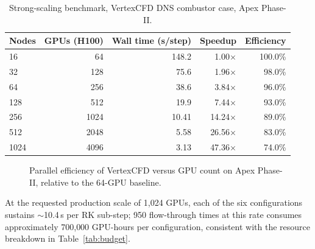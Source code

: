 \documentclass[11pt,a4paper]{scrartcl}
\begin{document}
\begin{table}[h!]
\centering
\caption{Strong-scaling benchmark, VertexCFD DNS combustor case, Apex Phase-II.}
\label{tab:scaling}
\begin{tabular}{@{}lrrrr@{}}
\toprule
\textbf{Nodes} & \textbf{GPUs (H100)} & \textbf{Wall time (s/step)} & \textbf{Speedup} & \textbf{Efficiency} \\
\midrule
16   & 64   & 148.2 & 1.00$\times$  & 100.0\% \\
32   & 128  & 75.6  & 1.96$\times$  & 98.0\%  \\
64   & 256  & 38.6  & 3.84$\times$  & 96.0\%  \\
128  & 512  & 19.9  & 7.44$\times$  & 93.0\%  \\
256  & 1024 & 10.41 & 14.24$\times$ & 89.0\%  \\
512  & 2048 & 5.58  & 26.56$\times$ & 83.0\%  \\
1024 & 4096 & 3.13  & 47.36$\times$ & 74.0\%  \\
\bottomrule
\end{tabular}
\end{table}

\begin{figure}[h!]
\centering
{}
\caption{Parallel efficiency of VertexCFD versus GPU count on Apex Phase-II, relative to the 64-GPU baseline.}
\label{fig:scaling}
\end{figure}

At the requested production scale of 1{,}024 GPUs, each of the six configurations sustains $\sim$10.4\,s per RK sub-step; 950 flow-through times at this rate consumes approximately 700{,}000 GPU-hours per configuration, consistent with the resource breakdown in Table~\ref{tab:budget}.
\end{document}
